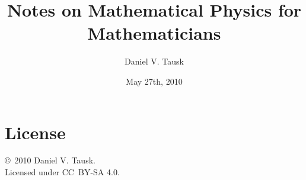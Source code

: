 \documentclass[oneside,a4paper,11pt]{amsbook}
\title[Notes on Mathematical Physics]{Notes on Mathematical Physics for Mathematicians}
\author{Daniel V. Tausk}
\date{May 27th, 2010}
\theoremstyle{remark}\newtheorem{exercise}{Exercise}[chapter]
\theoremstyle{plain}\newtheorem{teo}{Theorem}[section]
\theoremstyle{plain}\newtheorem{lem}[teo]{Lemma}
\theoremstyle{plain}\newtheorem{prop}[teo]{Proposition}
\theoremstyle{plain}\newtheorem{cor}[teo]{Corollary}
\theoremstyle{definition}\newtheorem{defin}[teo]{Definition}
\theoremstyle{remark}\newtheorem{rem}[teo]{Remark}
\theoremstyle{definition}\newtheorem{notation}[teo]{Notation}
\theoremstyle{definition}\newtheorem{convention}[teo]{Convention}
\theoremstyle{definition}\newtheorem{example}[teo]{Example}
\numberwithin{section}{chapter}
\numberwithin{equation}{section}
\begin{document}
\frontmatter
\maketitle

\chapter*{License}
\noindent
\copyright\ 2010 Daniel V. Tausk.
\\
Licensed under CC~BY-SA 4.0.

\renewcommand{\contentsline}[3]{\csname novo#1\endcsname{#2}{#3}}
\newcommand{\novochapter}[2]{\bigskip\hbox to \hsize{\vbox{\advance\hsize by -1cm\baselineskip=12pt\parfillskip=0pt\leftskip=3cm\noindent\hskip -2cm #1\leaders\hbox{.}\hfil\hfil\par}$\,$#2\hfil}}
\newcommand{\novosection}[2]{\medskip\hbox to \hsize{\vbox{\advance\hsize by -1cm\baselineskip=12pt\parfillskip=0pt\leftskip=3.5cm\noindent\hskip -2cm #1\leaders\hbox{.}\hfil\hfil\par}$\,$#2\hfil}}
\newcommand{\novosubsection}[2]{\baselineskip=12pt}
\tableofcontents

\mainmatter
\end{document}
